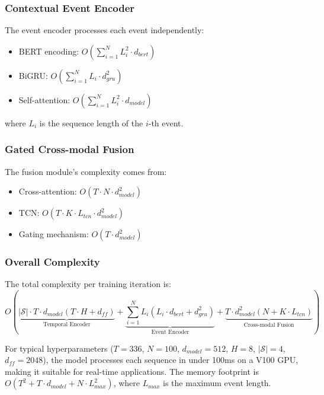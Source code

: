 \subsubsection{Contextual Event Encoder}
The event encoder processes each event independently:
\begin{itemize}
    \item BERT encoding: $O(\sum_{i=1}^N L_i^2 \cdot d_{bert})$
    \item BiGRU: $O(\sum_{i=1}^N L_i \cdot d_{gru}^2)$
    \item Self-attention: $O(\sum_{i=1}^N L_i^2 \cdot d_{model})$
\end{itemize}
where $L_i$ is the sequence length of the $i$-th event.

\subsubsection{Gated Cross-modal Fusion}
The fusion module's complexity comes from:
\begin{itemize}
    \item Cross-attention: $O(T \cdot N \cdot d_{model}^2)$
    \item TCN: $O(T \cdot K \cdot L_{tcn} \cdot d_{model}^2)$
    \item Gating mechanism: $O(T \cdot d_{model}^2)$
\end{itemize}

\subsubsection{Overall Complexity}
The total complexity per training iteration is:
\begin{equation*}
O\left(
\underbrace{|\mathcal{S}| \cdot T \cdot d_{model} (T \cdot H + d_{ff})}_{\text{Temporal Encoder}} +
\underbrace{\sum_{i=1}^N L_i (L_i \cdot d_{bert} + d_{gru}^2)}_{\text{Event Encoder}} +
\underbrace{T \cdot d_{model}^2 (N + K \cdot L_{tcn})}_{\text{Cross-modal Fusion}}
\right)
\end{equation*}

For typical hyperparameters ($T=336$, $N=100$, $d_{model}=512$, $H=8$, $|\mathcal{S}|=4$, $d_{ff}=2048$), the model processes each sequence in under 100ms on a V100 GPU, making it suitable for real-time applications. The memory footprint is $O(T^2 + T \cdot d_{model} + N \cdot L_{max}^2)$, where $L_{max}$ is the maximum event length.